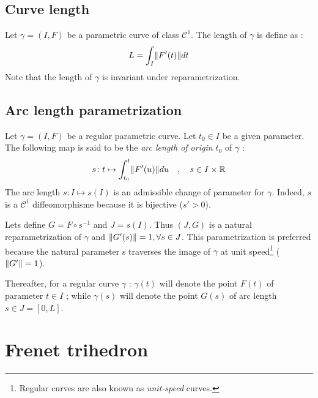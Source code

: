 \subsection{Curve length}
Let $\gamma=(I,F)$ be a parametric curve of class ${\mathcal{C}}^{1}$. The length of $\gamma$ is define as :
\begin{equation}
	L=\int_{I}\lVert F'(t)\rVert dt
\end{equation}
Note that the length of $\gamma$ is invariant under reparametrization.

\subsection{Arc length parametrization}
Let $\gamma=(I,F)$ be a regular parametric curve. Let $t_0 \in I$ be a given parameter. The following map is said to be the \emph{arc length of origin $t_0$} of $\gamma$ :
\begin{equation}
	s \colon t \mapsto \int_{t_{0}}^{t}\lVert F'(u)\rVert du
	\quad,\quad
	s \in I \times \mathbb{R}
\end{equation}
The arc length $s \colon I\mapsto s(I)$ is an admissible change of parameter for $\gamma$. Indeed, $s$ is a ${\mathcal{C}}^{1}$ diffeomorphisme because it is bijective ($s'>0$).

Lets define $G=F\circ s^{-1}$ and $J=s(I)$. Thus $(J,G)$ is a natural reparametrization of $\gamma$ and  $\lVert G'(s)\rVert = 1, \forall s \in J$. This parametrization is preferred because the natural parameter s traverses the image of $\gamma$ at unit speed\footnote{Regular curves are also known as \emph{unit-speed} curves.} ($\lVert G'\rVert = 1$).

Thereafter, for a regular curve $\gamma$ : $\gamma(t)$ will denote the point $F(t)$ of parameter $t \in I$ ; while $\gamma(s)$ will denote the point $G(s)$ of arc length $s \in J=[0,L]$.


\section{Frenet trihedron}\label{sec:frenettrihedron}


